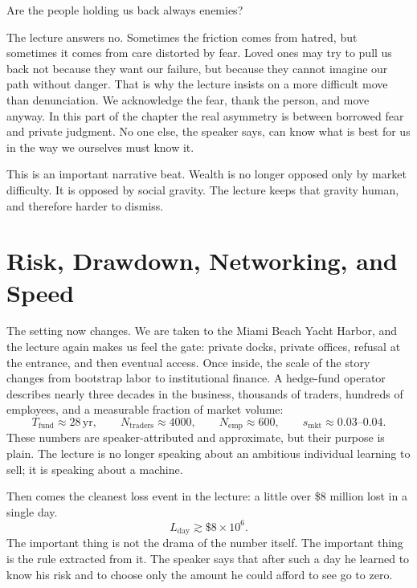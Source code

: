 Are the people holding us back always enemies?

The lecture answers no. Sometimes the friction comes from hatred, but sometimes it comes from care distorted by fear. Loved ones may try to pull us back not because they want our failure, but because they cannot imagine our path without danger. That is why the lecture insists on a more difficult move than denunciation. We acknowledge the fear, thank the person, and move anyway. In this part of the chapter the real asymmetry is between borrowed fear and private judgment. No one else, the speaker says, can know what is best for us in the way we ourselves must know it.

This is an important narrative beat. Wealth is no longer opposed only by market difficulty. It is opposed by social gravity. The lecture keeps that gravity human, and therefore harder to dismiss.

\section{Risk, Drawdown, Networking, and Speed}

The setting now changes. We are taken to the Miami Beach Yacht Harbor, and the lecture again makes us feel the gate: private docks, private offices, refusal at the entrance, and then eventual access. Once inside, the scale of the story changes from bootstrap labor to institutional finance. A hedge-fund operator describes nearly three decades in the business, thousands of traders, hundreds of employees, and a measurable fraction of market volume:
\begin{equation}
T_{\mathrm{fund}} \approx 28\,\mathrm{yr},
\qquad
N_{\mathrm{traders}} \approx 4000,
\qquad
N_{\mathrm{emp}} \approx 600,
\qquad
s_{\mathrm{mkt}} \approx 0.03\text{--}0.04.
\end{equation}
These numbers are speaker-attributed and approximate, but their purpose is plain. The lecture is no longer speaking about an ambitious individual learning to sell; it is speaking about a machine.

Then comes the cleanest loss event in the lecture: a little over \$8 million lost in a single day.
\begin{equation}
L_{\mathrm{day}} \gtrsim \$8\times 10^{6}.
\end{equation}
The important thing is not the drama of the number itself. The important thing is the rule extracted from it. The speaker says that after such a day he learned to know his risk and to choose only the amount he could afford to see go to zero.

